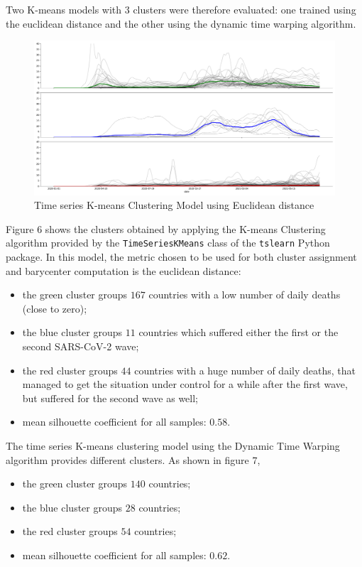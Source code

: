 \documentclass[11pt,a4paper]{article}
\begin{document}
Two K-means models with $3$ clusters were therefore evaluated: one trained using
the euclidean distance and the other using the dynamic time warping algorithm.
\begin{figure}[H]
    \begin{center}
        \includegraphics[scale=0.32]{img/daily-deaths-euclidean-clusters.pdf}
    \end{center}
    \vspace{-0.3cm}
    \caption{Time series K-means Clustering Model using Euclidean distance}
\end{figure}
\noindent
Figure 6 shows the clusters obtained by applying the K-means Clustering
algorithm provided by the \texttt{TimeSeriesKMeans} class of the
\texttt{tslearn} Python package. In this model, the metric chosen to be used for
both cluster assignment and barycenter computation is the euclidean distance:
\begin{itemize}
    \item the {\color{ForestGreen}green cluster} groups $167$ countries with
    a low number of daily deaths (close to zero);
    \item the {\color{blue}blue cluster} groups $11$ countries which suffered
    either the first or the second SARS-CoV-2 wave;
    \item the {\color{red}red cluster} groups $44$ countries with a huge number
    of daily deaths, that managed to get the situation under control for a while
    after the first wave, but suffered for the second wave as well;
    \item mean silhouette coefficient for all samples: $0.58$.
\end{itemize}
The time series K-means clustering model using the Dynamic Time Warping
algorithm provides different clusters. As shown in figure 7,
\begin{itemize}
    \item the {\color{ForestGreen}green cluster} groups $140$ countries;
    \item the {\color{blue}blue cluster} groups $28$ countries;
    \item the {\color{red}red cluster} groups $54$ countries;
    \item mean silhouette coefficient for all samples: $0.62$.
\end{itemize}
\end{document}
